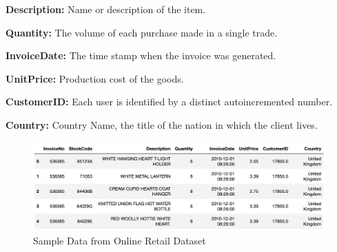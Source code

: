 \documentclass[conference]{IEEEtran}
\begin{document}
 \textbf{Description:} Name or description of the item.
 
 \textbf{Quantity:} The volume of each purchase made in a single trade.
 
\textbf{InvoiceDate:} The time stamp when the invoice was generated.

\textbf{UnitPrice:} Production cost of the goods.

\textbf{CustomerID:} Each user is identified by a distinct autoincremented number.

\textbf{Country:} Country Name, the title of the nation in which the client lives.

 \begin{figure}[h]
\centering
 \includegraphics[width=\columnwidth]{sample}
 \caption{Sample Data from Online Retail Dataset}
 \end{figure}


\begin{table}[]
\centering
\caption{Online Retail Dataset Statistics}
\label{tab:my-table}
\end{table}
\end{document}
